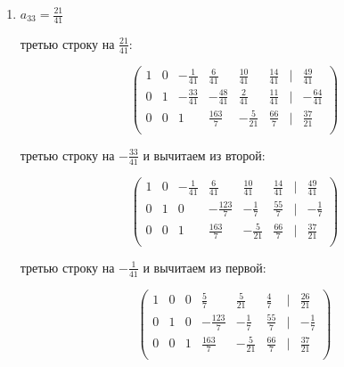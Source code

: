 \documentclass{report}
\begin{document}
\begin{itemize}
\begin{enumerate}
\begin{itemize}
			
			
			
		\end{itemize}
		
	\item{$a_{33}=\frac{21}{41}$}
	
	\begin{itemize}
		
		 третью строку на $\frac{21}{41}$:
		
		\begin{center}
			\Large{
				\[
				\begin{pmatrix}
					1 & 0 & -\frac{1}{41} & \frac{6}{41} & \frac{10}{41} & \frac{14}{41} & | & \frac{49}{41} \\
					0 & 1 & -\frac{33}{41} & -\frac{48}{41} & \frac{2}{41} & \frac{11}{41} & | & -\frac{64}{41} \\
					0 & 0 & 1 & \frac{163}{7} & -\frac{5}{21} & \frac{66}{7} & | & \frac{37}{21} \\
				\end{pmatrix}
				\]
			}
		\end{center}
		
		 третью строку на $-\frac{33}{41}$ и вычитаем из второй:
		
		\begin{center}
			\Large{
				\[
				\begin{pmatrix}
					1 & 0 & -\frac{1}{41} & \frac{6}{41} & \frac{10}{41} & \frac{14}{41} & | & \frac{49}{41} \\
					0 & 1 & 0 & -\frac{123}{7} & -\frac{1}{7} & \frac{55}{7} & | & -\frac{1}{7} \\
					0 & 0 & 1 & \frac{163}{7} & -\frac{5}{21} & \frac{66}{7} & | & \frac{37}{21} \\
				\end{pmatrix}
				\]
			}
		\end{center}
		
		 третью строку на $-\frac{1}{41}$ и вычитаем из первой:
		
		\begin{center}
			\Large{
				\[
				\begin{pmatrix}
					1 & 0 & 0 & \frac{5}{7} & \frac{5}{21} & \frac{4}{7} & | & \frac{26}{21} \\
					0 & 1 & 0 & -\frac{123}{7} & -\frac{1}{7} & \frac{55}{7} & | & -\frac{1}{7} \\
					0 & 0 & 1 & \frac{163}{7} & -\frac{5}{21} & \frac{66}{7} & | & \frac{37}{21} \\
				\end{pmatrix}
				\]
			}
		\end{center}
			 

\end{itemize}
\end{enumerate}
\end{itemize}
\end{document}
